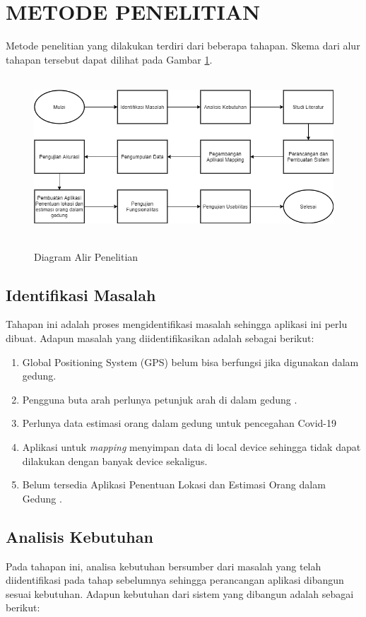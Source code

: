 \section{\uppercase{METODE PENELITIAN}}
Metode penelitian yang dilakukan terdiri dari beberapa tahapan. Skema dari alur tahapan tersebut dapat dilihat pada Gambar \ref{metpen}.
\begin{figure}[H]
	\centering
	{\includegraphics [width = 14cm, height= 6cm]{gambar/metodepenelitian.drawio }}
	\caption{Diagram Alir Penelitian}
	\label{metpen}
\end{figure}

\fancyhf{}
\fancyfoot[R]{\thepage}

\subsection{Identifikasi Masalah}
Tahapan ini adalah proses mengidentifikasi masalah sehingga aplikasi ini perlu dibuat. Adapun masalah yang diidentifikasikan adalah sebagai berikut:
\begin{enumerate}[1.]
	\itemsep0em
	\item Global Positioning System (GPS) belum bisa berfungsi jika digunakan dalam gedung.
	\item Pengguna buta arah perlunya petunjuk arah di dalam gedung
	      \citep{Keluza2017}.
	\item Perlunya data estimasi orang dalam gedung untuk pencegahan Covid-19
	\item Aplikasi untuk \textit{mapping} menyimpan data di local device sehingga tidak dapat dilakukan dengan banyak device sekaligus.
	\item Belum tersedia Aplikasi Penentuan Lokasi dan Estimasi Orang dalam Gedung .
\end{enumerate}

\subsection{Analisis Kebutuhan}
Pada tahapan ini, analisa kebutuhan bersumber dari masalah yang telah diidentifikasi pada tahap sebelumnya sehingga perancangan aplikasi dibangun sesuai kebutuhan. Adapun kebutuhan dari sistem yang dibangun adalah sebagai berikut:


